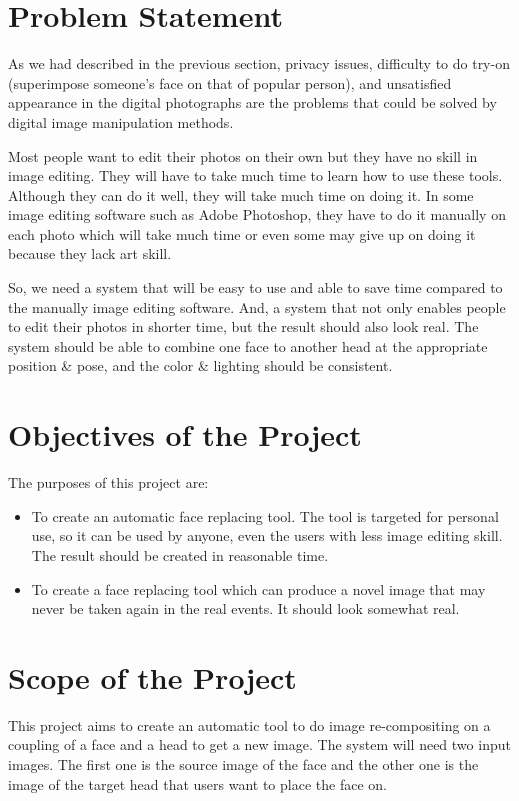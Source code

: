 \section{Problem Statement}
\hspace{0.5in}As we had described in the previous section, privacy issues, difficulty to do try-on (superimpose someone's face on that of popular person), and unsatisfied appearance in the digital photographs are the problems that could be solved by digital image manipulation methods.

Most people want to edit their photos on their own but they have no skill in image editing. They will have to take much time to learn how to use these tools. Although they can do it well, they will take much time on doing it. In some image editing software such as Adobe Photoshop, they have to do it manually on each photo which will take much time or even some may give up on doing it because they lack art skill.

So, we need a system that will be easy to use and able to save time compared to the manually image editing software. And, a system that not only enables people to edit their photos in shorter time, but the result should also look real. The system should be able to combine one face to another head at the appropriate position \& pose, and the color \& lighting should be consistent.


\section{Objectives of the Project}
The purposes of this project are:
\begin{itemize}
\item To create an automatic face replacing tool. The tool is targeted for personal use, so it can be used by anyone, even the users with less image editing skill. The result should be created in reasonable time.
\item To create a face replacing tool which can produce a novel image that may never be taken again in the real events. It should look somewhat real.
\end{itemize}


\section{Scope of the Project}
\hspace{0.5in}This project aims to create an automatic tool to do image re-compositing on a coupling of a face and a head to get a new image. The system will need two input images. The first one is the source image of the face and  the other one is the image of the target head that users want to place the face on.

